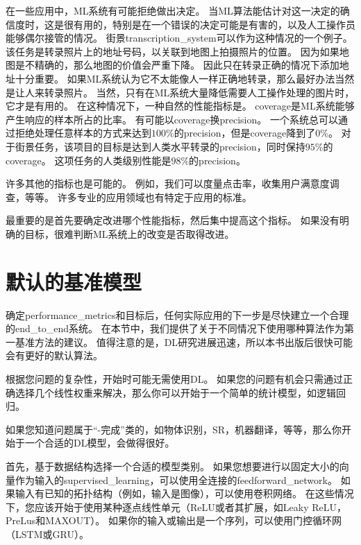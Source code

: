 
在一些应用中，\gls{ML}系统有可能拒绝做出决定。
当\gls{ML}算法能估计对这一决定的确信度时，这是很有用的，特别是在一个错误的决定可能是有害的，以及人工操作员能够偶尔接管的情况。
街景\gls{transcription_system}可以作为这种情况的一个例子。
该任务是转录照片上的地址号码，以关联到地图上拍摄照片的位置。
因为如果地图是不精确的，那么地图的价值会严重下降。
因此只在转录正确的情况下添加地址十分重要。
如果\gls{ML}系统认为它不太能像人一样正确地转录，那么最好办法当然是让人来转录照片。
当然，只有在\gls{ML}系统大量降低需要人工操作处理的图片时，它才是有用的。
在这种情况下，一种自然的性能指标是。
\gls{coverage}是\gls{ML}系统能够产生响应的样本所占的比率。
有可能以\gls{coverage}换\gls{precision}。
一个系统总可以通过拒绝处理任意样本的方式来达到$100\%$的\gls{precision}，但是\gls{coverage}降到了$0\%$。
对于街景任务，该项目的目标是达到人类水平转录的\gls{precision}，同时保持$95\%$的\gls{coverage}。
这项任务的人类级别性能是$98\%$的\gls{precision}。

许多其他的指标也是可能的。
例如，我们可以度量点击率，收集用户满意度调查，等等。
许多专业的应用领域也有特定于应用的标准。

最重要的是首先要确定改进哪个性能指标，然后集中提高这个指标。
如果没有明确的目标，很难判断\gls{ML}系统上的改变是否取得改进。


\section{默认的基准模型}
\label{sec:default_baseline_models}
确定\gls{performance_metrics}和目标后，任何实际应用的下一步是尽快建立一个合理的\gls{end_to_end}系统。
在本节中，我们提供了关于不同情况下使用哪种算法作为第一基准方法的建议。
值得注意的是，\gls{DL}研究进展迅速，所以本书出版后很快可能会有更好的默认算法。

根据您问题的复杂性，开始时可能无需使用\gls{DL}。
如果您的问题有机会只需通过正确选择几个线性权重来解决，那么你可以开始于一个简单的统计模型，如逻辑回归。

如果您知道问题属于``-完成''类的，如物体识别，\gls{SR}，机器翻译，等等，那么你开始于一个合适的\gls{DL}模型，会做得很好。

首先，基于数据结构选择一个合适的模型类别。
如果您想要进行以固定大小的向量作为输入的\gls{supervised_learning}，可以使用全连接的\gls{feedforward_network}。
如果输入有已知的拓扑结构（例如，输入是图像），可以使用卷积网络。
在这些情况下，您应该开始于使用某种逐点线性单元（ReLU或者其扩展，如Leaky ReLU，PreLus和MAXOUT）。
如果你的输入或输出是一个序列，可以使用门控循环网（LSTM或GRU）。


